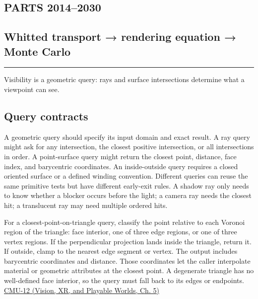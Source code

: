 \subsection{PARTS 2014--2030}\label{04-visual-computing-ii-ch028-parts-20142030}

\subsection{Whitted transport → rendering equation → Monte Carlo}\label{04-visual-computing-ii-ch028-whitted-transport-rendering-equation-monte-carlo}

\begin{center}\rule{0.5\linewidth}{0.5pt}\end{center}

Visibility is a geometric query: rays and surface intersections determine what a viewpoint can see.

\subsection{Query contracts}\label{04-visual-computing-ii-ch028-query-contracts}

A geometric query should specify its input domain and exact result. A ray query might ask for any intersection, the closest positive intersection, or all intersections in order. A point-surface query might return the closest point, distance, face index, and barycentric coordinates. An inside-outside query requires a closed oriented surface or a defined winding convention. Different queries can reuse the same primitive tests but have different early-exit rules. A shadow ray only needs to know whether a blocker occurs before the light; a camera ray needs the closest hit; a translucent ray may need multiple ordered hits.

For a closest-point-on-triangle query, classify the point relative to each Voronoi region of the triangle: face interior, one of three edge regions, or one of three vertex regions. If the perpendicular projection lands inside the triangle, return it. If outside, clamp to the nearest edge segment or vertex. The output includes barycentric coordinates and distance. Those coordinates let the caller interpolate material or geometric attributes at the closest point. A degenerate triangle has no well-defined face interior, so the query must fall back to its edges or endpoints. \href{../07-Vision-XR-and-Playable-Worlds/main.pdf\#nameddest=04-visual-computing-ii-ch036-cmu-12---geometric-queries}{CMU-12 (Vision, XR, and Playable Worlds, Ch. 5)}

